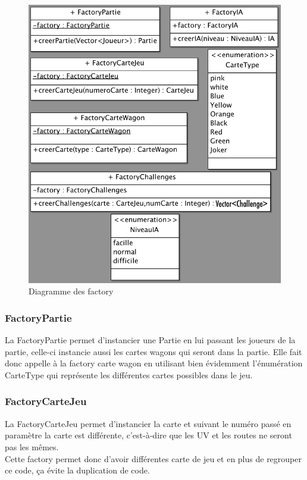 \documentclass{report}
\begin{document}
\begin{figure}[H]
\center
\includegraphics[width=400pt]{diagFactory.png}
\caption{Diagramme des factory}
\label{Factory}
\end{figure}
\subsubsection{FactoryPartie}
La FactoryPartie permet d'instancier une Partie en lui passant les joueurs de la partie, celle-ci instancie aussi les cartes wagons qui seront dans la partie. Elle fait donc appelle à la factory carte wagon en utilisant bien évidemment l'énumération CarteType qui représente les différentes cartes possibles dans le jeu.
\subsubsection{FactoryCarteJeu}
La FactoryCarteJeu permet d'instancier la carte et suivant le numéro passé en paramètre la carte est différente, c'est-à-dire que les UV et les routes ne seront pas les mêmes.\\
Cette factory permet donc d'avoir différentes carte de jeu et en plus de regrouper ce code, ça évite la duplication de code.
\end{document}
